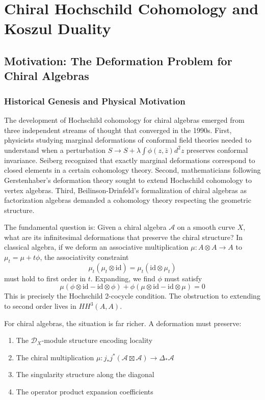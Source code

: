 \chapter{Chiral Hochschild Cohomology and Koszul Duality}

\section{Motivation: The Deformation Problem for Chiral Algebras}

\subsection{Historical Genesis and Physical Motivation}

The development of Hochschild cohomology for chiral algebras emerged from three independent streams of thought that converged in the 1990s. First, physicists studying marginal deformations of conformal field theories needed to understand when a perturbation $S \to S + \lambda \int \phi(z,\bar{z}) d^2z$ preserves conformal invariance. Seiberg \cite{Sei88} recognized that exactly marginal deformations correspond to closed elements in a certain cohomology theory. Second, mathematicians following Gerstenhaber's deformation theory \cite{Ger63} sought to extend Hochschild cohomology to vertex algebras. Third, Beilinson-Drinfeld's formalization of chiral algebras \cite{BD04} as factorization algebras demanded a cohomology theory respecting the geometric structure.

The fundamental question is: Given a chiral algebra $\mathcal{A}$ on a smooth curve $X$, what are its infinitesimal deformations that preserve the chiral structure? In classical algebra, if we deform an associative multiplication $\mu: A \otimes A \to A$ to $\mu_t = \mu + t\phi$, the associativity constraint
\[
\mu_t(\mu_t \otimes \text{id}) = \mu_t(\text{id} \otimes \mu_t)
\]
must hold to first order in $t$. Expanding, we find $\phi$ must satisfy
\[
\mu(\phi \otimes \text{id} - \text{id} \otimes \phi) + \phi(\mu \otimes \text{id} - \text{id} \otimes \mu) = 0
\]
This is precisely the Hochschild 2-cocycle condition. The obstruction to extending to second order lives in $HH^3(A,A)$.

For chiral algebras, the situation is far richer. A deformation must preserve:
\begin{enumerate}
\item The $\mathcal{D}_X$-module structure encoding locality
\item The chiral multiplication $\mu: j_*j^*(\mathcal{A} \boxtimes \mathcal{A}) \to \Delta_*\mathcal{A}$
\item The singularity structure along the diagonal
\item The operator product expansion coefficients
\end{enumerate}

